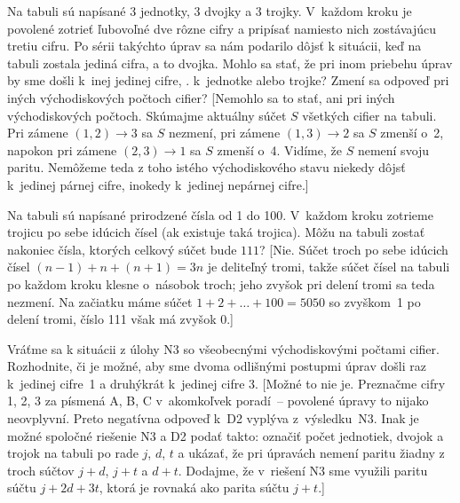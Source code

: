 {Na tabuli sú napísané 3 jednotky, 3 dvojky a 3 trojky.
V~každom kroku je povolené zotrieť ľubovoľné dve rôzne cifry a
pripísať namiesto nich zostávajúcu tretiu cifru. Po sérii takýchto úprav
sa nám podarilo dôjsť k situácii, keď na tabuli zostala jediná cifra,
a to dvojka. Mohlo sa stať, že pri inom priebehu úprav by sme došli
k~inej jedinej cifre, \tj. k~jednotke alebo trojke?
Zmení sa odpoveď pri iných východiskových počtoch cifier?
[Nemohlo sa to stať, ani pri iných východiskových počtoch.
Skúmajme aktuálny súčet $S$ všetkých cifier na tabuli.
Pri zámene $(1,2)\to3$ sa $S$ nezmení, pri zámene $(1,3)\to2$
sa $S$ zmenší o~2, napokon pri zámene $(2,3)\to1$ sa $S$ zmenší o~4.
Vidíme, že $S$ nemení svoju paritu. Nemôžeme teda z toho istého východiskového stavu
niekedy dôjsť k~jedinej párnej cifre, inokedy k~jedinej nepárnej cifre.]

\D
Na tabuli sú napísané prirodzené čísla od 1 do 100.
V~každom kroku zotrieme trojicu po sebe idúcich čísel (ak existuje
taká trojica). Môžu na tabuli zostať nakoniec čísla,
ktorých celkový súčet bude $111$?
[Nie. Súčet troch po sebe idúcich čísel $(n-1)+n+(n+1)=3n$ je
deliteľný tromi, takže súčet čísel na tabuli po každom kroku
klesne o~násobok troch; jeho zvyšok pri delení tromi sa teda
nezmení. Na začiatku máme súčet $1+2+\dots+100=5050$ so
zvyškom~1 po delení tromi, číslo 111 však má zvyšok 0.]

Vráťme sa k situácii z úlohy N3 so všeobecnými východiskovými počtami cifier.
Rozhodnite, či je možné, aby sme dvoma odlišnými postupmi úprav
došli raz k~jedinej cifre~1 a druhýkrát k~jedinej cifre 3.
[Možné to nie je. Preznačme cifry 1, 2, 3 za písmená A, B, C
v~akomkoľvek poradí~-- povolené úpravy to
nijako neovplyvní. Preto negatívna odpoveď k~D2 vyplýva z~výsledku~N3.
Inak je možné spoločné riešenie N3 a D2 podať takto: označiť počet jednotiek,
dvojok a trojok na tabuli po rade $j$, $d$, $t$ a ukázať, že pri
úpravách nemení paritu žiadny z troch súčtov $j+d$, $j+t$ a $d+t$.
Dodajme, že v~riešení N3 sme využili paritu súčtu $j+2d+3t$,
ktorá je rovnaká ako parita súčtu $j+t$.]
}

